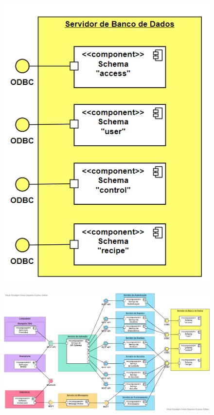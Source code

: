 \begin{figure}[H]
    \centering
    \includegraphics[scale=0.50]{figuras/projeto/software/camada_persistencia.PNG}
    \label{fig:camada_persistencia}
\end{figure}

\begin{figure}[ht]
    \centering
    \includegraphics[scale=0.50, angle=270]{figuras/projeto/software/diagrama_componentes.png}
    \label{fig:diagrama_componentes}
\end{figure}


